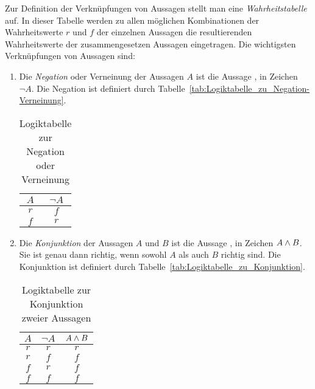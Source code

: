 Zur Definition der Verknüpfungen von Aussagen stellt man eine \emph{Wahrheitstabelle} auf. In dieser Tabelle werden zu allen möglichen Kombinationen der Wahrheitswerte $r$ und $f$ der einzelnen Aussagen die resultierenden Wahrheitswerte der zusammengesetzen Aussagen eingetragen. Die wichtigsten Verknüpfungen von Aussagen sind:
\begin{enumerate}
\item Die \emph{Negation} oder Verneinung der Aussagen $A$ ist die Aussage , in Zeichen $\neg A$. Die Negation ist definiert durch Tabelle~\vref{tab:Logiktabelle_zu_Negation-Verneinung}.
	\begin{table}[htb]
	\centering
	\begin{tabular}{c|c}
	$A$ & $\neg A$\\
	\hline
	$r$ & $f$\\
	$f$ & $r$
	\end{tabular}
	\label{tab:Logiktabelle_zu_Negation-Verneinung}
	\caption{Logiktabelle zur Negation oder Verneinung}
	\end{table}

\item Die \emph{Konjunktion} der Aussagen $A$ und $B$ ist die Aussage , in Zeichen $A \wedge B$. Sie ist genau dann richtig, wenn sowohl $A$ als auch $B$ richtig sind. Die Konjunktion ist definiert durch Tabelle~\vref{tab:Logiktabelle_zu_Konjunktion}.
	\begin{table}[htb]
	\centering
	\begin{tabular}{c|c|c}
	$A$ & $\neg A$ & $A \wedge B$\\
	\hline
	$r$ & $r$ & $r$\\
	$r$ & $f$ & $f$\\
	$f$ & $r$ & $f$\\
	$f$ & $f$ & $f$\\
	\end{tabular}
	\label{tab:Logiktabelle_zu_Konjunktion}
	\caption{Logiktabelle zur Konjunktion zweier Aussagen}
	\end{table}
\end{enumerate}
